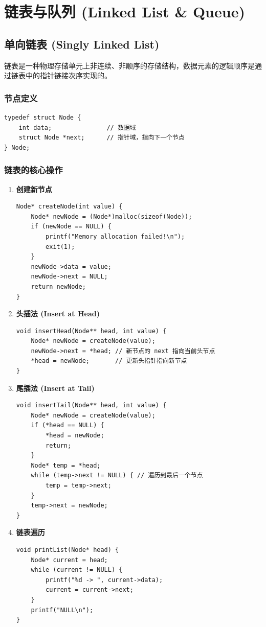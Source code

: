 \documentclass[a4paper,12pt]{article}
\begin{document}
\section{链表与队列 (Linked List \& Queue)}

\subsection{单向链表 (Singly Linked List)}
链表是一种物理存储单元上非连续、非顺序的存储结构，数据元素的逻辑顺序是通过链表中的指针链接次序实现的。

\subsubsection{节点定义}
\begin{lstlisting}[style=mystyle]
typedef struct Node {
    int data;               // 数据域
    struct Node *next;      // 指针域，指向下一个节点
} Node;
\end{lstlisting}

\subsubsection{链表的核心操作}
\begin{enumerate}
    \item \textbf{创建新节点}
    \begin{lstlisting}[style=mystyle]
Node* createNode(int value) {
    Node* newNode = (Node*)malloc(sizeof(Node));
    if (newNode == NULL) {
        printf("Memory allocation failed!\n");
        exit(1);
    }
    newNode->data = value;
    newNode->next = NULL;
    return newNode;
}
    \end{lstlisting}

    \item \textbf{头插法 (Insert at Head)}
    \begin{lstlisting}[style=mystyle]
void insertHead(Node** head, int value) {
    Node* newNode = createNode(value);
    newNode->next = *head; // 新节点的 next 指向当前头节点
    *head = newNode;       // 更新头指针指向新节点
}
    \end{lstlisting}

    \item \textbf{尾插法 (Insert at Tail)}
    \begin{lstlisting}[style=mystyle]
void insertTail(Node** head, int value) {
    Node* newNode = createNode(value);
    if (*head == NULL) {
        *head = newNode;
        return;
    }
    Node* temp = *head;
    while (temp->next != NULL) { // 遍历到最后一个节点
        temp = temp->next;
    }
    temp->next = newNode;
}
    \end{lstlisting}

    \item \textbf{链表遍历}
    \begin{lstlisting}[style=mystyle]
void printList(Node* head) {
    Node* current = head;
    while (current != NULL) {
        printf("%d -> ", current->data);
        current = current->next;
    }
    printf("NULL\n");
}
    \end{lstlisting}
\end{enumerate}
\end{document}
